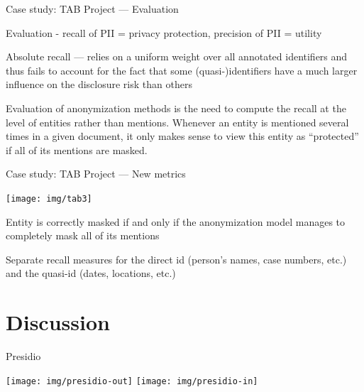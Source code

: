 \documentclass[12pt,aspectratio=169,handout]{beamer}
\begin{document}
\begin{frame}{Case study: TAB Project --- Evaluation}

Evaluation - recall of PII = privacy protection, precision of PII = utility

Absolute recall --- relies on a uniform weight over all annotated identifiers and thus fails to account for the fact that some (quasi-)identifiers have a much larger influence on the disclosure risk than others

Evaluation of anonymization methods is the need to compute the recall at the level of entities rather than mentions. Whenever an entity is mentioned several times in a given document, it only makes sense to view this entity as “protected” if all of its mentions are masked.

\end{frame}


\begin{frame}{Case study: TAB Project --- New metrics}

\texttt{[image: img/tab3]}

Entity is correctly masked if and only if the anonymization model manages to completely mask all of its mentions

Separate recall measures for the direct id (person’s names, case numbers, etc.) and the quasi-id (dates, locations, etc.)

\end{frame}

\section{Discussion}

\begin{frame}{Presidio}

\texttt{[image: img/presidio-out]}
\pause
\texttt{[image: img/presidio-in]}

\end{frame}
\end{document}
